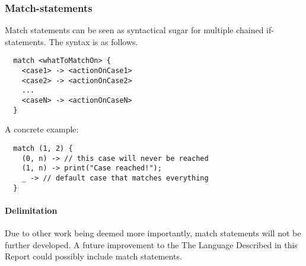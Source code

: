 \subsubsection{Match-statements}
\label{subsec:matchStatements}

Match statements can be seen as syntactical sugar for multiple chained if-statements. The syntax is as follows.

\begin{verbatim}
  match <whatToMatchOn> {
    <case1> -> <actionOnCase1>
    <case2> -> <actionOnCase2>
    ...
    <caseN> -> <actionOnCaseN>
  }
\end{verbatim}

A concrete example:

\begin{verbatim}
  match (1, 2) {
    (0, n) -> // this case will never be reached
    (1, n) -> print("Case reached!");
    _ -> // default case that matches everything
  }
\end{verbatim}

\paragraph{Delimitation}

Due to other work being deemed more importantly, match statements will not be further developed. A future improvement to the The Language Described in this Report could possibly include match statements.